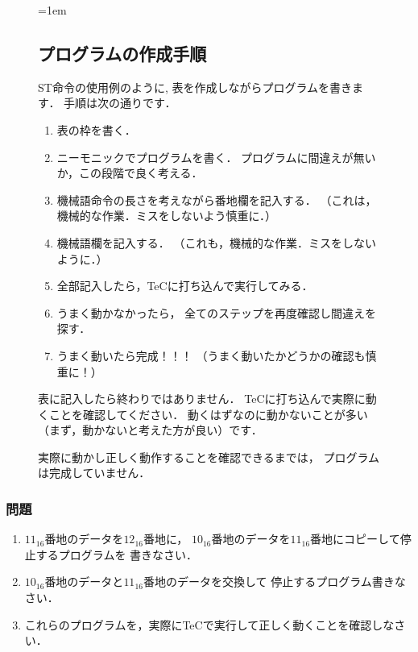 \begin{figure}[tbp]
  \begin{framed}{\parindent=1em
      \subsection*{プログラムの作成手順}
      ST命令の使用例のように,
      表を作成しながらプログラムを書きます．
      手順は次の通りです．
      \begin{enumerate}
      \item 表の枠を書く．
      \item ニーモニックでプログラムを書く．
        プログラムに間違えが無いか，この段階で良く考える．
      \item 機械語命令の長さを考えながら番地欄を記入する．
        （これは，機械的な作業．ミスをしないよう慎重に．）
      \item 機械語欄を記入する．
        （これも，機械的な作業．ミスをしないように．）
      \item 全部記入したら，TeCに打ち込んで実行してみる．
      \item うまく動かなかったら，
        全てのステップを再度確認し間違えを探す．
      \item うまく動いたら完成！！！
        （うまく動いたかどうかの確認も慎重に！）
      \end{enumerate}

      表に記入したら終わりではありません．
      TeCに打ち込んで実際に動くことを確認してください．
      動くはずなのに動かないことが多い（まず，動かないと考えた方が良い）です．

      実際に動かし正しく動作することを確認できるまでは，
      プログラムは完成していません．
  }\end{framed}
\end{figure}

\vfill
\subsubsection{問題}
\begin{enumerate}
\item $11_{16}$番地のデータを$12_{16}$番地に，
  $10_{16}$番地のデータを$11_{16}$番地にコピーして停止するプログラムを
  書きなさい．
\item $10_{16}$番地のデータと$11_{16}$番地のデータを交換して
  停止するプログラム書きなさい．
\item これらのプログラムを，実際にTeCで実行して正しく動くことを確認しなさい．
\end{enumerate}
\vfill

